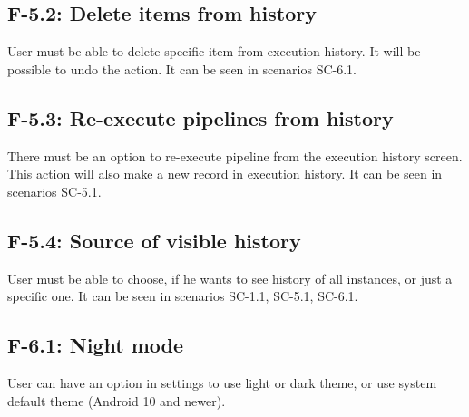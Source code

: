 \subsection*{F-5.2: Delete items from history}
User must be able to delete specific item from execution history. It will be possible to undo the action. It can be seen in scenarios SC-6.1.
\subsection*{F-5.3: Re-execute pipelines from history}
There must be an option to re-execute pipeline from the execution history screen. This action will also make a new record in execution history. It can be seen in scenarios SC-5.1.
\subsection*{F-5.4: Source of visible history}
User must be able to choose, if he wants to see history of all instances, or just a specific one. It can be seen in scenarios SC-1.1, SC-5.1, SC-6.1.
\subsection*{F-6.1: Night mode}
User can have an option in settings to use light or dark theme, or use system default theme (Android 10 and newer).
